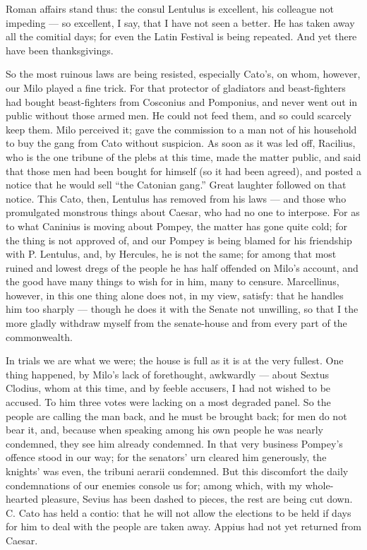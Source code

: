  Roman affairs stand thus: the consul Lentulus is excellent, his colleague not impeding --- so excellent, I say, that I have not seen a better. He has taken away all the comitial days; for even the Latin Festival is being repeated. And yet there have been thanksgivings.

 So the most ruinous laws are being resisted, especially Cato's, on whom, however, our Milo played a fine trick. For that protector of gladiators and beast-fighters had bought beast-fighters from Cosconius and Pomponius, and never went out in public without those armed men. He could not feed them, and so could scarcely keep them. Milo perceived it; gave the commission to a man not of his household to buy the gang from Cato without suspicion. As soon as it was led off, Racilius, who is the one tribune of the plebs at this time, made the matter public, and said that those men had been bought for himself (so it had been agreed), and posted a notice that he would sell ``the Catonian gang.'' Great laughter followed on that notice. This Cato, then, Lentulus has removed from his laws --- and those who promulgated monstrous things about Caesar, who had no one to interpose. For as to what Caninius is moving about Pompey, the matter has gone quite cold; for the thing is not approved of, and our Pompey is being blamed for his friendship with P. Lentulus, and, by Hercules, he is not the same; for among that most ruined and lowest dregs of the people he has half offended on Milo's account, and the good have many things to wish for in him, many to censure. Marcellinus, however, in this one thing alone does not, in my view, satisfy: that he handles him too sharply --- though he does it with the Senate not unwilling, so that I the more gladly withdraw myself from the senate-house and from every part of the commonwealth.

 In trials we are what we were; the house is full as it is at the very fullest. One thing happened, by Milo's lack of forethought, awkwardly --- about Sextus Clodius, whom at this time, and by feeble accusers, I had not wished to be accused. To him three votes were lacking on a most degraded panel. So the people are calling the man back, and he must be brought back; for men do not bear it, and, because when speaking among his own people he was nearly condemned, they see him already condemned. In that very business Pompey's offence stood in our way; for the senators' urn cleared him generously, the knights' was even, the tribuni aerarii condemned. But this discomfort the daily condemnations of our enemies console us for; among which, with my whole-hearted pleasure, Sevius has been dashed to pieces, the rest are being cut down. C. Cato has held a contio: that he will not allow the elections to be held if days for him to deal with the people are taken away. Appius had not yet returned from Caesar.

